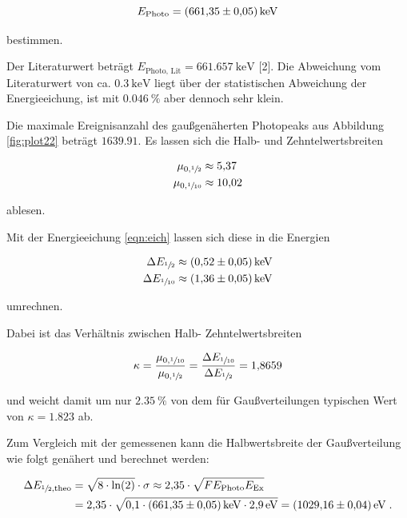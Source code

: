 \begin{equation*}
  E_\text{Photo} = \SI{661.35 +- 0.05}{\kilo\eV}
\end{equation*}

bestimmen.

Der Literaturwert beträgt $E_\text{Photo, Lit} = \SI{661.657}{\kilo\eV}$ [2]. Die Abweichung vom Literaturwert 
von ca. $\SI{0.3}{\kilo\eV}$ liegt über der statistischen Abweichung der Energieeichung, 
ist mit $\SI{0.046}{\percent}$ aber dennoch sehr klein.

Die maximale Ereignisanzahl des gaußgenäherten Photopeaks aus Abbildung \ref{fig:plot22} beträgt $\num{1639.91}$.
Es lassen sich die Halb- und Zehntelwertsbreiten 

\begin{align*}
  \mu_{0, \sfrac{1}{2}} &\approx \num{5.37} \\
  \mu_{0, \sfrac{1}{10}} &\approx \num{10.02}
\end{align*} 

ablesen.

Mit der Energieeichung \eqref{eqn:eich} lassen sich diese in die Energien

\begin{align*}
  \Delta E_{\sfrac{1}{2}} &\approx \SI{0.52 +- 0.05}{\kilo\eV} \\
  \Delta E_{\sfrac{1}{10}} &\approx \SI{1.36 +- 0.05}{\kilo\eV}
\end{align*}

umrechnen.

Dabei ist das Verhältnis zwischen Halb- Zehntelwertsbreiten

\begin{equation}
  \kappa = \frac{\mu_{0, \sfrac{1}{10}}}{\mu_{0, \sfrac{1}{2}}} = \frac{\Delta E_{\sfrac{1}{10}}}{\Delta E_{\sfrac{1}{2}}} = \num{1.8659}
\end{equation}

und weicht damit um nur $\SI{2.35}{\percent}$ von dem für Gaußverteilungen typischen Wert von $\kappa = \num{1.823}$ ab.

Zum Vergleich mit der gemessenen kann die Halbwertsbreite der Gaußverteilung wie folgt genähert und berechnet werden:

\begin{align}
  \Delta E_{\sfrac{1}{2}, \text{theo}} &= \sqrt{8 \cdot \text{ln}(2)} \cdot \sigma \approx \num{2.35} \cdot \sqrt{F E_\text{Photo} E_\text{Ex}} \\
  &= \num{2.35} \cdot \sqrt{\num{0.1}\cdot \SI{661.35 +- 0.05}{\kilo\eV} \cdot \SI{2.9}{\eV}} = \SI{1029.16 +- 0.04}{\eV} \; .
\end{align}

